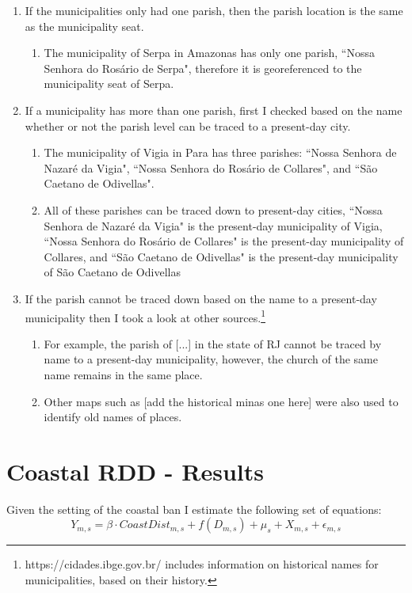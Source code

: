 \documentclass{article}
\begin{document}
\begin{enumerate}
  \item If the municipalities only had one parish, then the parish location is the same as the municipality seat.
  \begin{enumerate}
    \item The municipality of Serpa in Amazonas has only one parish, ``Nossa Senhora do Rosário de Serpa", therefore it is georeferenced to the municipality seat of Serpa.
  \end{enumerate}
  \item If a municipality has more than one parish, first I checked based on the name whether or not the parish level can be traced to a present-day city.
  \begin{enumerate}
    \item The municipality of Vigia in Para has three parishes: ``Nossa Senhora de Nazaré da Vigia", ``Nossa Senhora do Rosário de Collares", and ``São Caetano de Odivellas". 
    \item All of these parishes can be traced down to present-day cities, ``Nossa Senhora de Nazaré da Vigia" is the present-day municipality of Vigia, ``Nossa Senhora do Rosário de Collares" is the present-day municipality of Collares, and ``São Caetano de Odivellas" is the present-day municipality of São Caetano de Odivellas
  \end{enumerate}
  \item If the parish cannot be traced down based on the name to a present-day municipality then I took a look at other sources.\footnote{https://cidades.ibge.gov.br/ includes information on historical names for municipalities, based on their history.}
    \begin{enumerate}
      \item For example, the parish of [...] in the state of RJ cannot be traced by name to a present-day municipality, however, the church of the same name remains in the same place.
      \item Other maps such as [add the historical minas one here] were also used to identify old names of places.
    \end{enumerate}
\end{enumerate}

\clearpage

\section{Coastal RDD - Results}
\label{app:coastal_rdd}
Given the setting of the coastal ban I estimate the following set of equations:
\begin{equation}
  Y_{m,s} = \beta \cdot CoastDist_{m,s} + f(D_{m,s})+ \mu_s + X_{m,s} + \epsilon_{m,s}
\end{equation}
\end{document}
